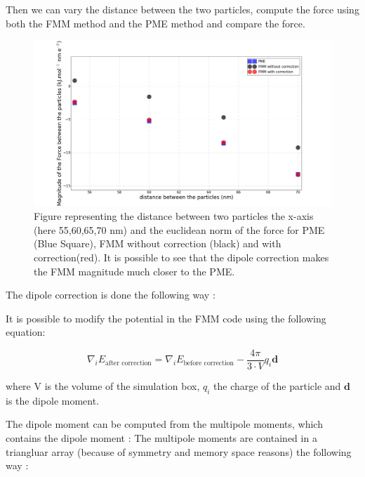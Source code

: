 \documentclass[10pt,twoside,a4paper]{report}
\begin{document}
	Then we can vary the distance between the two particles, compute the force using both the FMM method and the PME method and compare the force.	
	\begin{figure}
	   \includegraphics[scale=0.2]{dipoleCorrection}
    \centering 
    \caption{Figure representing the distance between two particles the x-axis (here 55,60,65,70 nm) and the  euclidean norm of the force for PME (Blue Square), FMM without correction (black) and with correction(red).
     It is possible to see that the dipole correction makes the FMM magnitude much closer to the PME.}    
   \end{figure}	
The dipole correction is done the following way :

It is possible to modify the potential in the FMM code using the following equation:

\begin{equation}
\label{eq:dipoleCorrection}
\nabla_iE_{\text{after correction}} = \nabla_iE_{\text{before correction}} - \frac{4\pi}{3 \cdot V} q_i \textbf{d}
\end{equation}	
	
	where V is the volume of the simulation box, $q_i$ the charge of the particle and $\textbf{d}$ is the dipole moment.

The dipole moment can be computed from the multipole moments, which contains the dipole moment : The multipole moments are contained in a triangluar array (because of symmetry and memory space reasons) the following way :
\end{document}
